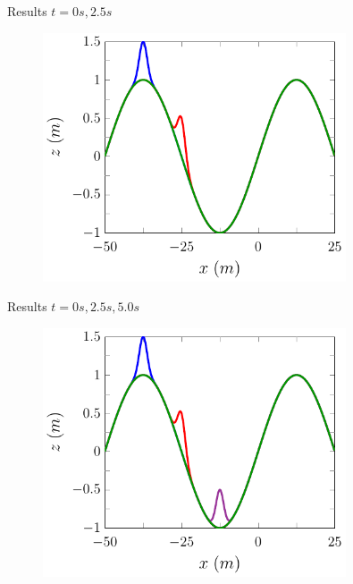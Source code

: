 \documentclass[pdf]{beamer}
\begin{document}
\begin{frame}{Results $t=0s,2.5s$}
	\begin{figure}
		\includegraphics[width=0.8\textwidth]{./Pics/DryBed/Forced/Stages025.pdf}
	\end{figure}
\end{frame}

\begin{frame}{Results $t=0s,2.5s,5.0s$}
	\begin{figure}
		\includegraphics[width=0.8\textwidth]{./Pics/DryBed/Forced/Stages02550.pdf}
	\end{figure}
\end{frame}
\end{document}
